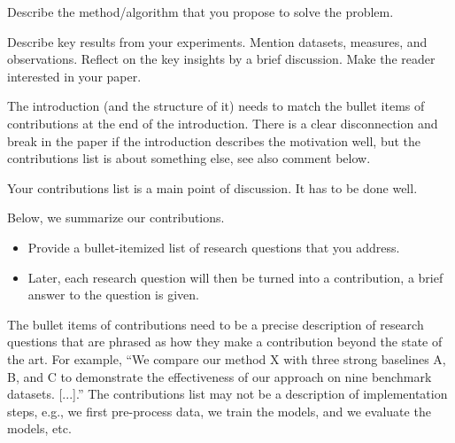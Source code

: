 \documentclass[sigconf, review, nonacm]{acmart}
\begin{document}


Describe the method/algorithm that you propose to solve the problem.


Describe key results from your experiments. 
Mention datasets, measures, and observations.
Reflect on the key insights by a brief discussion.
Make the reader interested in your paper.


\begin{tcolorbox}[title=Instruction: Write down your list of contributions.]
The introduction (and the structure of it) needs to match the bullet items of contributions at the end of the introduction. There is a clear disconnection and break in the paper if the introduction describes the motivation well, but the contributions list is about something else, see also comment below. 

Your contributions list is a main point of discussion. 
It has to be done well. 
\end{tcolorbox}

Below, we summarize our contributions.
\begin{itemize}
    \item Provide a bullet-itemized list of research questions that you address. 
    \item Later, each research question will then be turned into a contribution, \ie a brief answer to the question is given. 
\end{itemize}

\begin{tcolorbox}[title=Introduction What is a contribution item and what not.]
The bullet items of contributions need to be a precise description of research questions that are phrased as how they make a contribution beyond the state of the art. 
For example, ``We compare our method X with three strong baselines A, B, and C to demonstrate the effectiveness of our approach on nine benchmark datasets. [...].'' 
The contributions list may not be a description of implementation steps, e.g., we first pre-process data, we train the models, and we evaluate the models, etc. 


\end{tcolorbox}
\end{document}
